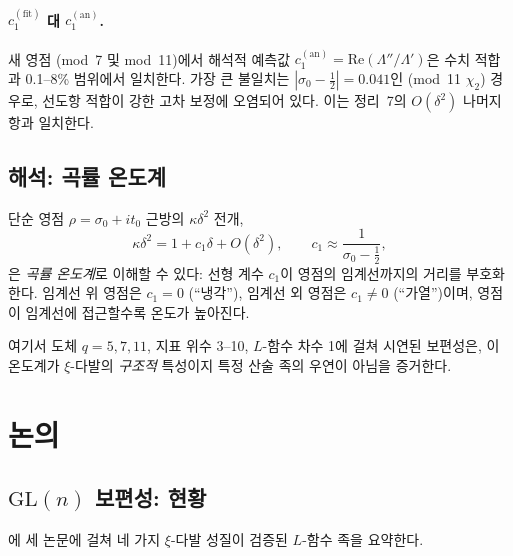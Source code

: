 \documentclass[11pt, a4paper]{article}
\theoremstyle{plain}
\theoremstyle{definition}
\newcommand{\abs}[1]{\left|#1\right|}
\newcommand{\Lam}{\Lambda}             %
\newcommand{\kap}{\kappa}             %
\begin{document}
\paragraph{$c_{1}^{(\mathrm{fit})}$ 대 $c_{1}^{(\mathrm{an})}$.}
새 영점 (mod~7 및 mod~11)에서 해석적 예측값
$c_{1}^{(\mathrm{an})} = \mathrm{Re}(\Lam''/\Lam')$은
수치 적합과 0.1--8\% 범위에서 일치한다. 가장 큰 불일치는
$\abs{\sigma_{0}-\tfrac{1}{2}} = 0.041$인 (mod~11 $\chi_{2}$) 경우로,
선도항 적합이 강한 고차 보정에 오염되어 있다.
이는 정리~7의 $O(\delta^{2})$ 나머지항과 일치한다.


\subsection{해석: 곡률 온도계}
\label{sec:thermometer}

단순 영점 $\rho = \sigma_{0}+it_{0}$ 근방의 $\kap\delta^{2}$ 전개,
\[
  \kap\delta^{2} = 1 + c_{1}\delta + O(\delta^{2}),
  \qquad c_{1} \approx \frac{1}{\sigma_{0}-\tfrac{1}{2}},
\]
은 \emph{곡률 온도계}로 이해할 수 있다: 선형 계수 $c_{1}$이
영점의 임계선까지의 거리를 부호화한다. 임계선 위 영점은 $c_{1}=0$
(``냉각''), 임계선 외 영점은 $c_{1} \neq 0$ (``가열'')이며,
영점이 임계선에 접근할수록 온도가 높아진다.

여기서 도체 $q=5,7,11$, 지표 위수 3--10, $L$-함수 차수 1에 걸쳐
시연된 보편성은, 이 온도계가 $\xi$-다발의 \emph{구조적} 특성이지
특정 산술 족의 우연이 아님을 증거한다.


\section{논의}
\label{sec:discussion}

\subsection{$\mathrm{GL}(n)$ 보편성: 현황}
\label{sec:universality-status}

에 세 논문에 걸쳐 네 가지 $\xi$-다발 성질이
검증된 $L$-함수 족을 요약한다.
\end{document}
